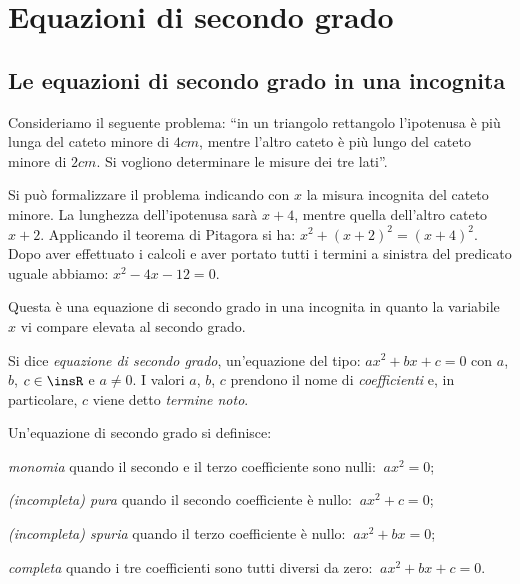 \chapter{Equazioni di secondo grado}
\section{Le equazioni di secondo grado in una incognita}

Consideriamo il seguente problema: ``in un triangolo rettangolo l'ipotenusa è più lunga del cateto minore di $4\unit{cm}$, mentre l'altro cateto è più lungo del cateto minore di $2\unit{cm}$. Si vogliono determinare le misure dei tre lati''.

Si può formalizzare il problema indicando con $x$ la misura incognita del cateto minore. La lunghezza dell'ipotenusa sarà $x + 4$, mentre quella dell'altro cateto $x + 2$. Applicando il teorema di Pitagora si ha: $x ^{2 } + ( x + 2 ) ^{2 } = ( x + 4 ) ^{2 }$. Dopo aver effettuato i calcoli e aver portato tutti i termini a sinistra del predicato uguale abbiamo: $x ^{2}-4x-12=0$.
\begin{center}

\end{center}
Questa è una equazione di secondo grado in una incognita in quanto la variabile $x$ vi compare elevata al secondo grado.
\begin{definizione}
Si dice \emph{equazione di secondo grado}, un'equazione del tipo: $a x ^{2} + b x + c = 0$ con $a$, $b$, $c \in \insR$ e $a \neq 0$. I valori $a$, $b$, $c$ prendono il nome di \emph{coefficienti} e, in particolare, $c$ viene detto \emph{termine noto}.
\end{definizione}

Un'equazione di secondo grado si definisce:
\begin{description*}
 \item \emph{monomia} quando il secondo e il terzo coefficiente sono nulli: $\:a x ^{2}=0$;
 \item \emph{(incompleta) pura} quando il secondo coefficiente è nullo: $\:a x ^{2} + c = 0$;
 \item \emph{(incompleta) spuria} quando il terzo coefficiente è nullo: $\:a x ^{2} + b x = 0$;
 \item \emph{completa} quando i tre coefficienti sono tutti diversi da zero: $\:a x ^{2} + b x + c = 0$.
\end{description*}

